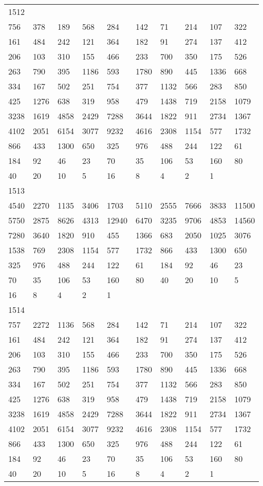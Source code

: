 \begin{longtable}{*{10}{l}}
1512&&&&&&&&&\\
756& 378& 189& 568& 284& 142& 71& 214& 107& 322\\
161& 484& 242& 121& 364& 182& 91& 274& 137& 412\\
206& 103& 310& 155& 466& 233& 700& 350& 175& 526\\
263& 790& 395& 1186& 593& 1780& 890& 445& 1336& 668\\
334& 167& 502& 251& 754& 377& 1132& 566& 283& 850\\
425& 1276& 638& 319& 958& 479& 1438& 719& 2158& 1079\\
3238& 1619& 4858& 2429& 7288& 3644& 1822& 911& 2734& 1367\\
4102& 2051& 6154& 3077& 9232& 4616& 2308& 1154& 577& 1732\\
866& 433& 1300& 650& 325& 976& 488& 244& 122& 61\\
184& 92& 46& 23& 70& 35& 106& 53& 160& 80\\
40& 20& 10& 5& 16& 8& 4& 2& 1& \\

1513&&&&&&&&&\\
4540& 2270& 1135& 3406& 1703& 5110& 2555& 7666& 3833& 11500\\
5750& 2875& 8626& 4313& 12940& 6470& 3235& 9706& 4853& 14560\\
7280& 3640& 1820& 910& 455& 1366& 683& 2050& 1025& 3076\\
1538& 769& 2308& 1154& 577& 1732& 866& 433& 1300& 650\\
325& 976& 488& 244& 122& 61& 184& 92& 46& 23\\
70& 35& 106& 53& 160& 80& 40& 20& 10& 5\\
16& 8& 4& 2& 1& \\

1514&&&&&&&&&\\
757& 2272& 1136& 568& 284& 142& 71& 214& 107& 322\\
161& 484& 242& 121& 364& 182& 91& 274& 137& 412\\
206& 103& 310& 155& 466& 233& 700& 350& 175& 526\\
263& 790& 395& 1186& 593& 1780& 890& 445& 1336& 668\\
334& 167& 502& 251& 754& 377& 1132& 566& 283& 850\\
425& 1276& 638& 319& 958& 479& 1438& 719& 2158& 1079\\
3238& 1619& 4858& 2429& 7288& 3644& 1822& 911& 2734& 1367\\
4102& 2051& 6154& 3077& 9232& 4616& 2308& 1154& 577& 1732\\
866& 433& 1300& 650& 325& 976& 488& 244& 122& 61\\
184& 92& 46& 23& 70& 35& 106& 53& 160& 80\\
40& 20& 10& 5& 16& 8& 4& 2& 1& \\


\end{longtable}
